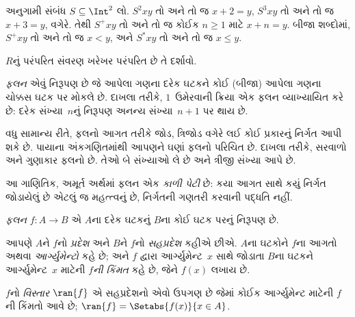 \begin{ex}
અનુગામી સંબંધ $S \subseteq \Int^2$ લો.
$S^2xy$ તો અને તો જ $x + 2 = y$,
$S^3xy$ તો અને તો જ $x + 3 = y$, વગેરે.
તેથી $S^+xy$ તો અને તો જ કોઈક $n \geq 1$ માટે
$x + n = y$. બીજા શબ્દોમાં, $S^+xy$ તો અને તો જ $x < y$,
અને $S^*xy$ તો અને તો જ $x \le y$.
\end{ex}

\begin{prob}
$R$નું પરંપરિત સંવરણ ખરેખર પરંપરિત છે તે દર્શાવો.
\end{prob}
\endgroup


\OLEndChapterHook
\endgroup


\begingroup
\makeatletter{}\makeatother

\label{guunit:OLP-0020}


\begingroup
\makeatletter{}\makeatother

\label{guunit:OLP-0021}


\begin{explain}
\emph{ફલન} એવું નિરૂપણ છે જે આપેલા ગણના દરેક ઘટકને
કોઈ (બીજા) આપેલા ગણના ચોક્કસ ઘટક પર મોકલે છે.
દાખલા તરીકે, $1$~ઉમેરવાની ક્રિયા એક ફલન વ્યાખ્યાયિત કરે છે:
દરેક સંખ્યા~$n$નું નિરૂપણ અનન્ય સંખ્યા~$n+1$ પર થાય છે.

વધુ સામાન્ય રીતે, ફલનો આગત તરીકે જોડ, ત્રિજોડ વગેરે લઈ
કોઈ પ્રકારનું નિર્ગત આપી શકે છે. પાયાના અંકગણિતમાંથી આપણને
ઘણાં ફલનો પરિચિત છે. દાખલા તરીકે, સરવાળો અને ગુણાકાર
ફલનો છે. તેઓ બે સંખ્યાઓ લે છે અને ત્રીજી સંખ્યા આપે છે.

આ ગાણિતિક, અમૂર્ત અર્થમાં ફલન એક \emph{કાળી પેટી} છે:
કયા આગત સાથે કયું નિર્ગત જોડાયેલું છે એટલું જ મહત્ત્વનું છે,
નિર્ગતની ગણતરી કરવાની પદ્ધતિ નહીં.
\end{explain}

\begin{defn}[ફલન]
\emph{ફલન} $f \colon A \to B$ એ $A$ના દરેક ઘટકનું
$B$ના કોઈ ઘટક પરનું નિરૂપણ છે.

આપણે $A$ને $f$નો \emph{પ્રદેશ} અને $B$ને $f$નો
\emph{સહપ્રદેશ} કહીએ છીએ. $A$ના ઘટકોને $f$ના
આગતો અથવા \emph{આર્ગ્યુમેન્ટો} કહે છે; અને $f$ દ્વારા આર્ગ્યુમેન્ટ~$x$ સાથે
જોડાતા $B$ના ઘટકને આર્ગ્યુમેન્ટ~$x$ માટેની
\emph{$f$ની કિંમત} કહે છે, જેને $f(x)$ લખાય છે.

$f$નો \emph{વિસ્તાર} $\ran{f}$ એ સહપ્રદેશનો એવો ઉપગણ છે
જેમાં કોઈક આર્ગ્યુમેન્ટ માટેની $f$ની કિંમતો આવે છે;
$\ran{f} =
\Setabs{f(x)}{x \in A}$.
\end{defn}

